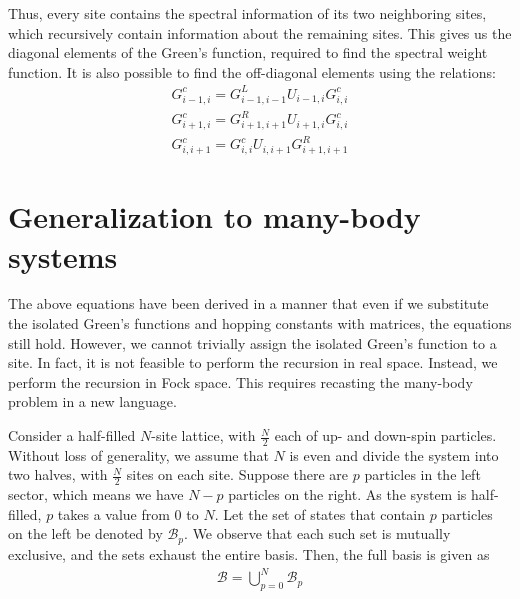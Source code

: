	Thus, every site contains the spectral information of its two neighboring sites, which recursively contain information about the remaining sites. This gives us the diagonal elements of the Green's function, required to find the spectral weight function. It is also possible to find the off-diagonal elements using the relations:
	\begin{align}
		G^{c}_{i-1,i} = G^{L}_{i-1,i-1} U_{i-1,i} G^{c}_{i,i}\\
		G^{c}_{i+1,i} = G^{R}_{i+1,i+1} U_{i+1,i} G^{c}_{i,i}\\
		G^{c}_{i,i+1} = G^{c}_{i,i} U_{i,i+1} G^{R}_{i+1,i+1}
	\end{align}

\section{Generalization to many-body systems}
	The above equations have been derived in a manner that even if we substitute the isolated Green's functions and hopping constants with matrices, the equations still hold.
	However, we cannot trivially assign the isolated Green's function to a site. In fact, it is not feasible to perform the recursion in real space. Instead, we perform the recursion in Fock space. This requires recasting the many-body problem in a new language.
	
	Consider a half-filled $ N $-site lattice, with $ \tfrac{N}{2} $ each of up- and down-spin particles. Without loss of generality, we assume that $ N $ is even and divide the system into two halves, with $ \tfrac{N}{2} $ sites on each site. Suppose there are $ p $ particles in the left sector, which means we have $ N-p $ particles on the right. As the system is half-filled, $ p $ takes a value from $ 0 $ to $ N $. Let the set of states that contain $ p $ particles on the left be denoted by $ \mathcal{B}_{p} $. We observe that each such set is mutually exclusive, and the sets exhaust the entire basis. Then, the full basis is given as
	\begin{align}
		\mathcal{B} = \bigcup_{p = 0}^{N} \mathcal{B}_p
	\end{align}
	
